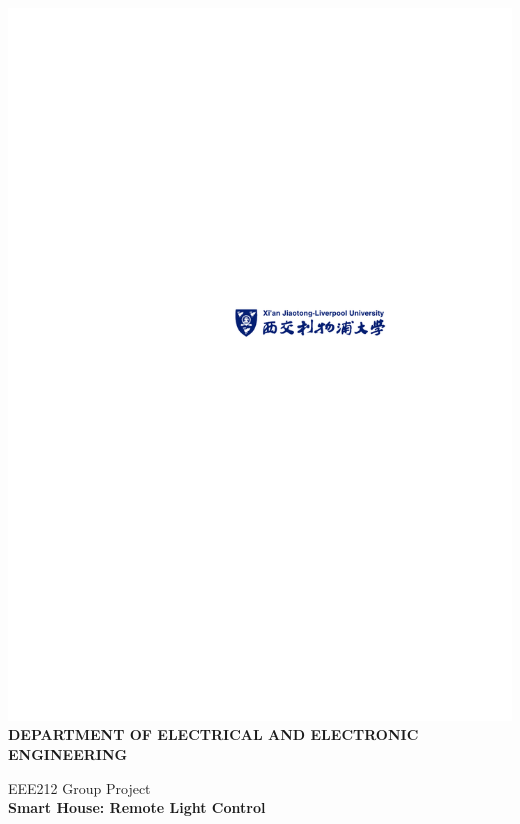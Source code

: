 \documentclass[12pt,a4paper]{report}
\begin{document}
\begin{titlepage}
\begin{center}
\includegraphics[scale=1.5]{figures/CoverSheet}\\
\bf{ \small{DEPARTMENT OF ELECTRICAL AND ELECTRONIC ENGINEERING} }
\end{center}

\vspace{18mm}
 \begin{center}
 \begin{Large}
 {EEE212 Group Project}\\ 
 \vspace{2.0cm}
 \bf{Smart House: Remote Light Control}
 \end{Large}
 \end{center} 
\vspace{2.0cm}

  \begin{center}
  \begin{large}
     \begin{tabular}{r@{ }l} 
     	

\end{tabular}
\end{large}
\end{center}
\end{titlepage}
\end{document}
